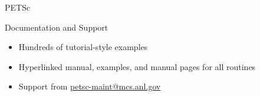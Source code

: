 \begin{frame}{PETSc}
  \begin{block}{Documentation and Support}
   \begin{itemize}\vspace*{-0.2cm}
    \item Hundreds of tutorial-style examples
    \item Hyperlinked manual, examples, and manual pages for all routines
    \item Support from \url{petsc-maint@mcs.anl.gov}
   \end{itemize}
  \end{block}
\end{frame}
